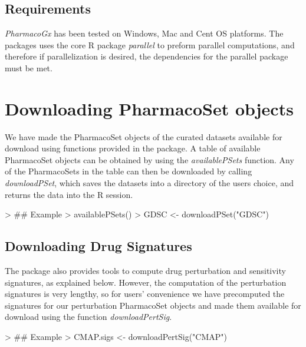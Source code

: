\documentclass[11pt]{article}
\begin{document}
\subsection*{Requirements}

\textit{PharmacoGx} has been tested on Windows, Mac and Cent OS platforms. The packages uses the core R package \textit{parallel} to preform parallel computations, and therefore if parallelization is desired, the dependencies for the parallel package must be met. 

\section{Downloading PharmacoSet objects}

We have made the PharmacoSet objects of the curated datasets available for download using functions provided in the package. A table of available PharmacoSet objects can be obtained by using the \textit{availablePSets} function. Any of the PharmacoSets in the table can then be downloaded by calling \textit{downloadPSet}, which saves the datasets into a directory of the users choice, and returns the data into the R session. 

\begin{Schunk}
\begin{Sinput}
> ## Example
> availablePSets()
> GDSC <- downloadPSet("GDSC") 
\end{Sinput}
\end{Schunk}
\subsection*{Downloading Drug Signatures}

The package also provides tools to compute drug perturbation and sensitivity signatures, as explained below. However, the computation of the perturbation signatures is very lengthy, so for users' convenience we have precomputed the signatures for our perturbation PharmacoSet objects and made them available for download using the function \textit{downloadPertSig}.

\begin{Schunk}
\begin{Sinput}
> ## Example
> CMAP.sigs <- downloadPertSig("CMAP")
\end{Sinput}
\end{Schunk}
\end{document}
